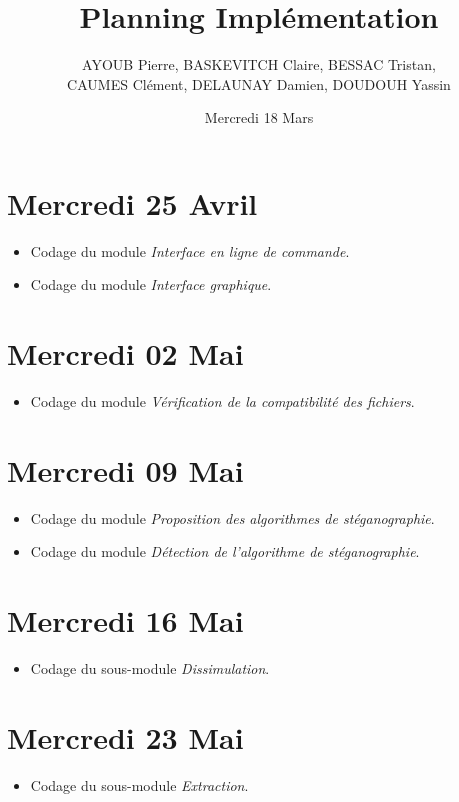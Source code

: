 \documentclass[11pt]{article}
\title{Planning Implémentation}
\author{AYOUB Pierre, BASKEVITCH Claire, BESSAC Tristan, \\
CAUMES Clément, DELAUNAY Damien, DOUDOUH Yassin}
\date{Mercredi 18 Mars}
\begin{document}
\maketitle

\section{Mercredi 25 Avril}
\begin {itemize}
\item Codage du module \textit{Interface en ligne de commande}.
\item Codage du module \textit{Interface graphique}. 
\end{itemize}

\section{Mercredi 02 Mai}
\begin {itemize}
\item Codage du module \textit{Vérification de la compatibilité des fichiers}. 
\end{itemize}

\section{Mercredi 09 Mai}
\begin {itemize}
\item Codage du module \textit{Proposition des algorithmes de stéganographie}. 
\item Codage du module \textit{Détection de l'algorithme de stéganographie}. 
\end{itemize}

\section{Mercredi 16 Mai}
\begin {itemize}
\item Codage du sous-module \textit{Dissimulation}. 
\end{itemize}

\section{Mercredi 23 Mai}
\begin {itemize}
\item Codage du sous-module \textit{Extraction}. 
\end{itemize}
\end{document}
